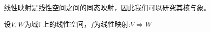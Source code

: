 
线性映射是线性空间之间的同态映射，因此我们可以研究其核与象。
\begin{definition}{}
设$V,W$为域$\mathbb F$上的线性空间，$f$为线性映射:$V\Rightarrow W$
\end{definition}